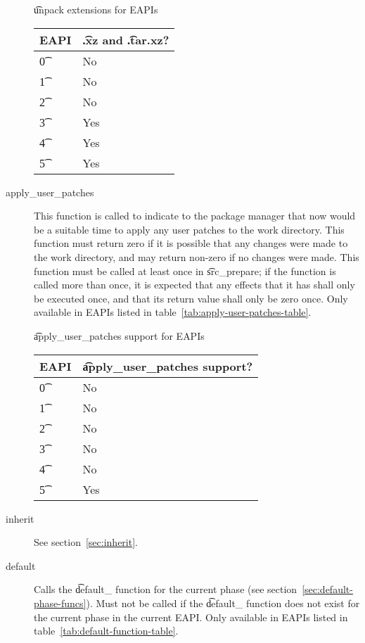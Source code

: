 \begin{description}
\begin{centertable}{\t{unpack} extensions for EAPIs} \label{tab:unpack-extensions-table}
    \begin{tabular}{ l l }
        \toprule
            \multicolumn{1}{c}{\textbf{EAPI}} &
            \multicolumn{1}{c}{\textbf{\t{.xz} and \t{.tar.xz}?}} \\
            \midrule
    \t{0} & No \\
    \t{1} & No \\
    \t{2} & No \\
    \t{3} & Yes \\
    \t{4} & Yes \\
    \t{5} & Yes \\
    \bottomrule
    \end{tabular}
\end{centertable}

\item[apply\_user\_patches]
     This function is called to indicate to the package manager
    that now would be a suitable time to apply any user patches to the work directory. This function
    must return zero if it is possible that any changes were made to the work directory, and may
    return non-zero if no changes were made. This function must be called at least once in
    \t{src\_prepare}; if the function is called more than once, it is expected that any effects that
    it has shall only be executed once, and that its return value shall only be zero once. Only
    available in EAPIs listed in table~\ref{tab:apply-user-patches-table}.

\begin{centertable}{\t{apply\_user\_patches} support for EAPIs} \label{tab:apply-user-patches-table}
    \begin{tabular}{ l l }
        \toprule
            \multicolumn{1}{c}{\textbf{EAPI}} &
            \multicolumn{1}{c}{\textbf{\t{apply\_user\_patches} support?}} \\
            \midrule
    \t{0} & No \\
    \t{1} & No \\
    \t{2} & No \\
    \t{3} & No \\
    \t{4} & No \\
    \t{5} & Yes \\
    \bottomrule
    \end{tabular}
\end{centertable}

\item[inherit] See section~\ref{sec:inherit}.

\item[default]
     Calls the \t{default\_} function for the current phase (see
    section~\ref{sec:default-phase-funcs}).  Must not be called if the \t{default\_} function
    does not exist for the current phase in the current EAPI.  Only available in EAPIs listed in
    table~\ref{tab:default-function-table}.
\end{description}

